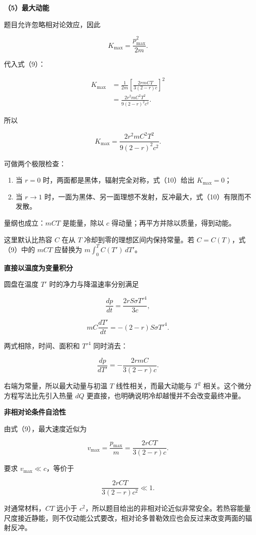 \documentclass[12pt,a4paper,UTF8]{ctexart}
\newcommand{\tightlist}{\setlength{\itemsep}{0pt}\setlength{\parskip}{0pt}}
\begin{document}
\textbf{（5）最大动能}

题目允许忽略相对论效应，因此

\[
K_{\max}=\frac{p_{\max}^2}{2m}.
\]

代入式（9）：

\[
\begin{aligned}
K_{\max}
&=\frac1{2m}
\left[\frac{2rmCT}{3(2-r)c}\right]^2\\
&=\frac{2r^2mC^2T^2}{9(2-r)^2c^2}.
\end{aligned}
\]

所以

\[
\boxed{
K_{\max}=\frac{2r^2mC^2T^2}{9(2-r)^2c^2}
}.
\tag{10}
\]

可做两个极限检查：

\begin{enumerate}
\def\labelenumi{\arabic{enumi}.}
\tightlist
\item
  当 \(r=0\) 时，两面都是黑体，辐射完全对称，式（10）给出
  \(K_{\max}=0\)；
\item
  当 \(r\to1\)
  时，一面为黑体、另一面理想不发射，反冲最大，式（10）有限而不发散。
\end{enumerate}

量纲也成立：\(mCT\) 是能量，除以 \(c\)
得动量；再平方并除以质量，得到动能。

这里默认比热容 \(C\) 在从 \(T\) 冷却到零的理想区间内保持常量。若
\(C=C(T)\)，式（9）中的 \(mCT\) 应替换为 \(m\int_0^TC(T')\,dT'\)。

\textbf{直接以温度为变量积分}

圆盘在温度 \(T'\) 时的净力与降温速率分别满足

\[
\frac{dp}{dt}=\frac{2rS\sigma T'^4}{3c},
\]

\[
mC\frac{dT'}{dt}=-(2-r)S\sigma T'^4.
\]

两式相除，时间、面积和 \(T'^4\) 同时消去：

\[
\frac{dp}{dT'}
=-\frac{2rmC}{3(2-r)c}.
\]

右端为常量，所以最大动量与初温 \(T\) 线性相关，而最大动能与 \(T^2\)
相关。这个微分方程写法比先引入热量 \(dQ\)
更直接，也明确说明冷却越慢并不会改变最终冲量。

\textbf{非相对论条件自洽性}

由式（9），最大速度近似为

\[
v_{\max}=\frac{p_{\max}}m
=\frac{2rCT}{3(2-r)c}.
\]

要求 \(v_{\max}\ll c\)，等价于

\[
\frac{2rCT}{3(2-r)c^2}\ll1.
\]

对通常材料，\(CT\) 远小于
\(c^2\)，所以题目给出的非相对论近似非常安全。若热容能量尺度接近静能，则不仅动能公式要改，相对论多普勒效应也会反过来改变两面的辐射反冲。
\end{document}
